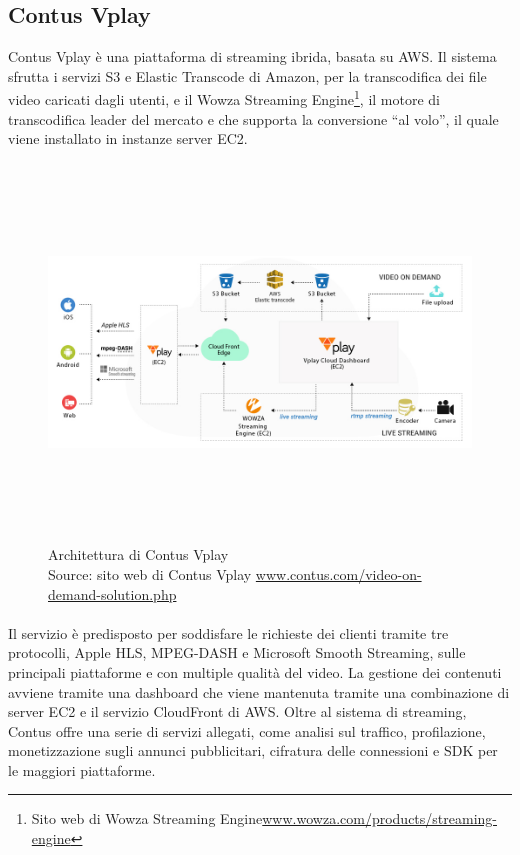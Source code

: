 		\subsection{Contus Vplay}
		Contus Vplay è una piattaforma di streaming ibrida, basata su \gls{AWS}. Il sistema sfrutta i servizi \gls{S3} e Elastic Transcode di Amazon, per la transcodifica dei file video caricati dagli utenti, e il Wowza Streaming Engine\footnote{Sito web di Wowza Streaming Engine\href{https://www.wowza.com/products/streaming-engine}{www.wowza.com/products/streaming-engine}}, il motore di transcodifica leader del mercato e che supporta la conversione ``al volo'', il quale viene installato in instanze server \gls{EC2}.
		\begin{figure}[H]
			\begin{center}
				\includegraphics[width=16.5cm,height=10cm,keepaspectratio]{immagini/contus-vplay-cloud-architecture.jpg}
				\caption[Architettura di Contus Vplay]{Architettura di Contus Vplay
				\\
				Source: sito web di Contus Vplay \href{http://www.contus.com/video-on-demand-solution.php}{www.contus.com/video-on-demand-solution.php}}
			\end{center}
		\end{figure}
		\paragraph*{} Il servizio è predisposto per soddisfare le richieste dei clienti tramite tre protocolli, Apple \gls{HLS}, \gls{MPEG-DASH} e Microsoft Smooth Streaming, sulle principali piattaforme e con multiple qualità del video. La gestione dei contenuti avviene tramite una dashboard che viene mantenuta tramite una combinazione di server \gls{EC2} e il servizio CloudFront di \gls{AWS}. Oltre al sistema di streaming, Contus offre una serie di servizi allegati, come analisi sul traffico, profilazione, monetizzazione sugli annunci pubblicitari, cifratura delle connessioni e \gls{SDK} per le maggiori piattaforme.
	
